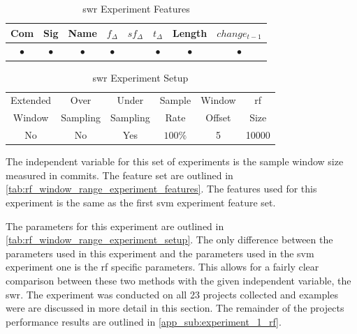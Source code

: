 \begin{table}[h]
\begin{center}

    \begin{tabular}{|c|c|c|c|c|c|c|c|}
        \hline
        Com & Sig & Name & $f_{\Delta}$ & $sf_{\Delta}$ & $t_\Delta$ & Length & $change_{t-1}$ \\
         \hline
        $\bullet$ & $\bullet$ & $\bullet$ & $\bullet$ & & $\bullet$ & $\bullet$ & $\bullet$ \\ \hline
    \end{tabular}
    \caption{\gls{swr} Experiment Features}
    \label{tab:rf_window_range_experiment_features}
\end{center}

\end{table}

\begin{table}[h]
\begin{center}

    \begin{tabular}{|c|c|c|c|c|c|}
        \hline
        Extended & Over & Under & Sample & Window & \gls{rf} \\
        Window & Sampling & Sampling & Rate & Offset & Size \\ \hline
        No & No & Yes & $100\%$ & 5 & 10000 \\ \hline
    \end{tabular}
    \caption{\gls{swr} Experiment Setup}
    \label{tab:rf_window_range_experiment_setup}
\end{center}

\end{table}

The independent variable for this set of experiments is the sample window size measured in commits. The feature set are outlined in \autoref{tab:rf_window_range_experiment_features}. The features used for this experiment is the same as the first \gls{svm} experiment feature set.

The parameters for this experiment are outlined in \autoref{tab:rf_window_range_experiment_setup}. The only difference between the parameters used in this experiment and the parameters used in the \gls{svm} experiment one is the \gls{rf} specific parameters. This allows for a fairly clear comparison between these two methods with the given independent variable, the \gls{swr}. The experiment was conducted on all 23 projects collected and examples were are discussed in more detail in this section. The remainder of the projects performance results are outlined in \autoref{app_sub:experiment_1_rf}.

